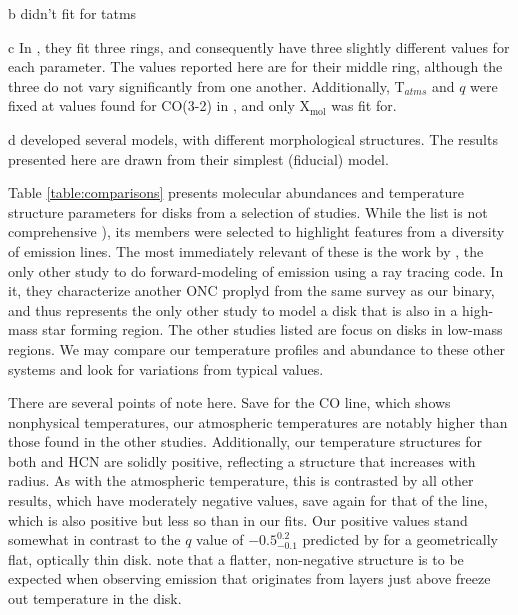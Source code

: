 \begin{table}[ht!]
\begin{threeparttable}
\begin{tablenotes}
      \item[b] \cite{Rosenfeld2012} didn't fit for tatms
      \item[c] In \citet{Flaherty2017}, they fit three rings, and consequently have three slightly different values for each parameter. The values reported here are for their middle ring, although the three do not vary significantly from one another. Additionally, T$_{atms}$ and $q$ were fixed at values found for CO(3-2) in \citet{Flaherty2015}, and only X$_\text{mol}$ was fit for.
      \item[d] \citet{Flaherty2018} developed several models, with different morphological structures. The results presented here are drawn from their simplest (fiducial) model.
    \end{tablenotes}
  \end{threeparttable}
\end{table}


Table \ref{table:comparisons} presents molecular abundances and temperature structure parameters for disks from a selection of studies. While the list is not comprehensive \citep[see ][for more example]{Panic2008,Panic2010,Hughes2008,Qi2003,Qi2004,Isella2007}), its members were selected to highlight features from a diversity of emission lines. The most immediately relevant of these is the work by \citet{Factor2017}, the only other study to do forward-modeling of emission using a ray tracing code. In it, they characterize another ONC proplyd from the same survey as our binary, and thus represents the only other study to model a disk that is also in a high-mass star forming region. The other studies listed are focus on disks in low-mass regions. We may compare our temperature profiles and abundance to these other systems and look for variations from typical values.

There are several points of note here. Save for the CO line, which shows nonphysical temperatures, our atmospheric temperatures are notably higher than those found in the other studies. Additionally, our temperature structures for both \hco and HCN are solidly positive, reflecting a structure that increases with radius. As with the atmospheric temperature, this is contrasted by all other results, which have moderately negative values, save again for that of the \citet{Factor2017} \hco line, which is also positive but less so than in our fits. Our positive values stand somewhat in contrast to the $q$ value of $-0.5_{-0.1}^{0.2}$ predicted by \citet{Dartois2003} for a geometrically flat, optically thin disk. \citet{Schwarz2016} note that a flatter, non-negative structure is to be expected when observing emission that originates from layers just above freeze out temperature in the disk.

